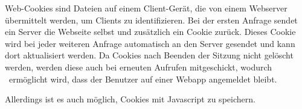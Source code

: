 
Web-Cookies sind Dateien auf einem Client-Gerät, die von einem Webserver übermittelt werden, um Clients zu identifizieren. 
Bei der ersten Anfrage sendet ein Server die Webseite selbst und zusätzlich ein Cookie zurück. 
Dieses Cookie wird bei jeder weiteren Anfrage automatisch an den Server gesendet und kann dort aktualisiert werden. 
Da Cookies nach Beenden der Sitzung nicht gelöscht werden, werden diese auch bei erneuten Aufrufen mitgeschickt, wodurch \zb\ ermöglicht wird, dass der Benutzer auf einer Webapp angemeldet bleibt. 

Allerdings ist es auch möglich, Cookies mit Javascript zu speichern. %
\cite{wikiCookies}
